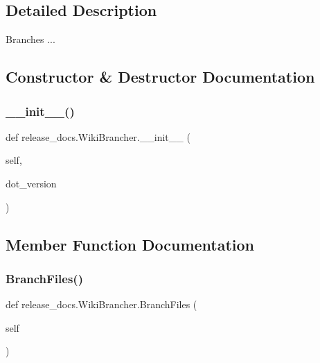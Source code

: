 \subsection{Detailed Description}
\begin{DoxyVerb}Branches ...\end{DoxyVerb}
 

\subsection{Constructor \& Destructor Documentation}
\mbox{\label{classrelease__docs_1_1_wiki_brancher_a344b32e2b65f0e8bab9fbf1e670d33fd}} 
\subsubsection{\texorpdfstring{\_\_init\_\_()}{\_\_init\_\_()}}
{\footnotesize\ttfamily def release\+\_\+docs.\+Wiki\+Brancher.\+\_\+\+\_\+init\+\_\+\+\_\+ (\begin{DoxyParamCaption}\item[{}]{self,  }\item[{}]{dot\+\_\+version }\end{DoxyParamCaption})}



\subsection{Member Function Documentation}
\mbox{\label{classrelease__docs_1_1_wiki_brancher_a5ef284f7e1742f465ecd0c14d2667327}} 
\subsubsection{\texorpdfstring{BranchFiles()}{BranchFiles()}}
{\footnotesize\ttfamily def release\+\_\+docs.\+Wiki\+Brancher.\+Branch\+Files (\begin{DoxyParamCaption}\item[{}]{self }\end{DoxyParamCaption})}

